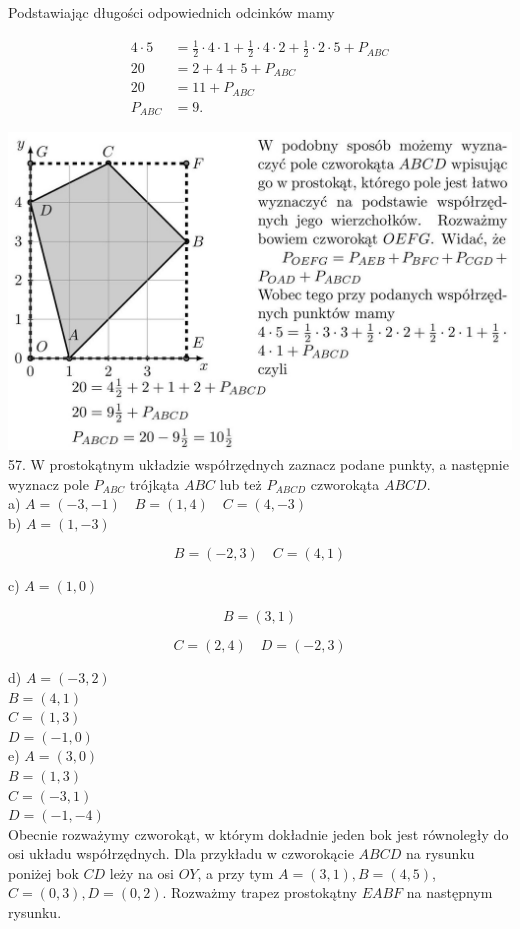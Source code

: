 \documentclass[10pt]{article}
\begin{document}
Podstawiając długości odpowiednich odcinków mamy

\[
\begin{aligned}
4 \cdot 5 & =\frac{1}{2} \cdot 4 \cdot 1+\frac{1}{2} \cdot 4 \cdot 2+\frac{1}{2} \cdot 2 \cdot 5+P_{A B C} \\
20 & =2+4+5+P_{A B C} \\
20 & =11+P_{A B C} \\
P_{A B C} & =9 .
\end{aligned}
\]

\includegraphics[max width=\textwidth, center]{2024_11_21_8f01584889ff06348ae7g-205}\\
57. W prostokątnym układzie współrzędnych zaznacz podane punkty, a następnie wyznacz pole \(P_{A B C}\) trójkąta \(A B C\) lub też \(P_{A B C D}\) czworokąta \(A B C D\).\\
a) \(A=(-3,-1) \quad B=(1,4) \quad C=(4,-3)\)\\
b) \(A=(1,-3)\)

\[
B=(-2,3) \quad C=(4,1)
\]

c) \(A=(1,0)\)

\[
B=(3,1)
\]

\[
C=(2,4) \quad D=(-2,3)
\]

d) \(A=(-3,2)\)\\
\(B=(4,1)\)\\
\(C=(1,3)\)\\
\(D=(-1,0)\)\\
e) \(A=(3,0)\)\\
\(B=(1,3)\)\\
\(C=(-3,1)\)\\
\(D=(-1,-4)\)\\
Obecnie rozważymy czworokąt, w którym dokładnie jeden bok jest równoległy do osi układu współrzędnych. Dla przykładu w czworokącie \(A B C D\) na rysunku poniżej bok \(C D\) leży na osi \(O Y\), a przy tym \(A=(3,1), B=(4,5)\), \(C=(0,3), D=(0,2)\). Rozważmy trapez prostokątny \(E A B F\) na następnym rysunku.
\end{document}
